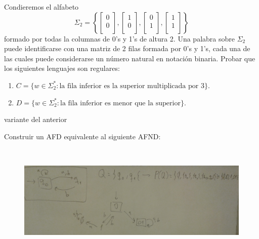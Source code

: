 \documentclass[twoside]{article}
\begin{document}
\begin{ejercicio}{9}
Condieremos el alfabeto
$$\Sigma_2 = \left\{\begin{bmatrix}
0\\
0\\
\end{bmatrix},\begin{bmatrix}
1\\
0\\
\end{bmatrix},\begin{bmatrix}
0\\
1\\
\end{bmatrix},\begin{bmatrix}
1\\
1\\
\end{bmatrix}\right\}$$
formado por todas la columnas de 0's y 1's de altura 2. Una palabra sobre $\Sigma_2$ puede identificarse
con una matriz de 2 filas formada por 0's y 1's, cada una de las cuales puede considerarse un
número natural en notación binaria. Probar que los siguientes lenguajes son regulares:
\begin{enumerate}
\item $C = \{w \in \Sigma^*_2
: \text{la fila inferior es la superior multiplicada por } 3\}$. 
\item $D = \{w \in \Sigma^*_2
: \text{la fila inferior es menor que la superior}\}$.  
\end{enumerate}
\end{ejercicio}
\begin{solucion}
variante del anterior
\end{solucion}
\newpage

\begin{ejercicio}{11}
Construir un AFD equivalente al siguiente AFND:
\end{ejercicio}
\begin{solucion}\

\begin{figure}[h!]
\includegraphics[scale=0.2]{Automatas/11}
\end{figure}\
\end{solucion}
\end{document}
